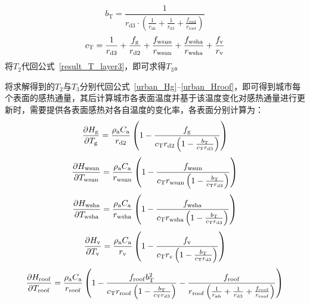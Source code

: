 %
\begin{equation}
  b_{\mathrm{T}} = \frac{1}{r_{\mathrm{d3}} \cdot \left(\frac{1}{r_{\mathrm{ah}}} + \frac{1}{r_{\mathrm{d3}}} + \frac{f_{\mathrm{roof}}}{r_{\mathrm{roof}}} \right)}
\end{equation}
%
\begin{equation}
  c_{\mathrm{T}} = \frac{1}{r_{\mathrm{d3}}} + \frac{f_{\mathrm{g}}}{r_{\mathrm{d2}}} + \frac{f_{\mathrm{wsun}}}{r_{\mathrm{wsun}}} + \frac{f_{\mathrm{wsha}}}{r_{\mathrm{wsha}}} + \frac{f_{\rm v}}{r_{\mathrm{v}}}
\end{equation}
将$T_{2}$代回公式~\eqref{result_T_layer3}，即可求得$T_{3}$。

将求解得到的$T_{2}$与$T_{3}$分别代回公式~\eqref{urban_Hg}--\eqref{urban_Hroof}，即可得到城市每个表面的感热通量，其后计算城市各表面温度并基于该温度变化对感热通量进行更新时，需要提供各表面感热对各自温度的变化率，各表面分别计算为：
\begin{equation}
  \frac{\partial H_{\mathrm{g}}}{\partial T_{\mathrm{g}}} = \frac{\rho _{\rm a} C_{\mathrm a}}{r_{\mathrm{d2}}} \left(1-\frac{f_{\rm g}}{c_{\mathrm{T}} r_{\mathrm{d2}} \left(1-\frac{b_{\mathrm {T}} }{c_{\mathrm{T}} r_{\mathrm{d3}}}\right)}\right)
\end{equation}
%
\begin{equation}
  \frac{\partial H_{\mathrm{wsun}}}{\partial T_{\mathrm{wsun}}} = \frac{\rho _{\rm a} C_{\mathrm a}}{r_{\mathrm{wsun}}} \left(1-\frac{f_{\mathrm{wsun}}}{c_{\mathrm{T}} r_{\mathrm{wsun}} \left(1-\frac{b_{\mathrm {T}} }{c_{\mathrm{T}} r_{\mathrm{d3}}}\right)}\right)
\end{equation}
%
\begin{equation}
  \frac{\partial H_{\mathrm{wsha}}}{\partial T_{\mathrm{wsha}}} = \frac{\rho _{\rm a} C_{\mathrm a}}{r_{\mathrm{wsha}}} \left(1-\frac{f_{\mathrm{wsha}}}{c_{\mathrm{T}} r_{\mathrm{wsha}} \left(1-\frac{b_{\mathrm {T}} }{c_{\mathrm{T}} r_{\mathrm{d3}}}\right)}\right)
\end{equation}
%
\begin{equation}
  \frac{\partial H_{\mathrm{v}}}{\partial T_{\mathrm{v}}} = \frac{\rho _{\rm a} C_{\mathrm a}}{r_{\mathrm{v}}} \left(1-\frac{f_{\mathrm{v}}}{c_{\mathrm{T}} r_{\mathrm{v}} \left(1-\frac{b_{\mathrm {T}} }{c_{\mathrm{T}} r_{\mathrm{d3}}}\right)}\right)
\end{equation}
%
\begin{equation}
  \frac{\partial H_{\mathrm{roof}}}{\partial T_{\mathrm{roof}}} = \frac{\rho _{\rm a} C_{\mathrm a}}{r_{\mathrm{roof}}} \left(1-\frac{f_{\mathrm{roof}} b_{\mathrm{T}}^2}{c_{\mathrm{T}} r_{\mathrm{roof}} \left(1-\frac{b_{\mathrm {T}} }{c_{\mathrm{T}} r_{\mathrm{d3}}}\right)}-\frac{f_{\mathrm{roof}}}{r_{\mathrm{roof}}\left(\frac{1}{r_{\mathrm{ah}}}+\frac{1}{r_{\mathrm{d3}}}+\frac{f_{\mathrm{roof}}}{r_{\mathrm{roof}}}\right)}\right)
\end{equation}

